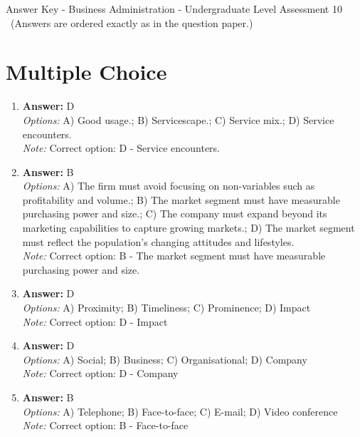 \documentclass[12pt]{article}
\begin{document}
\begin{center}
Answer Key - Business Administration - Undergraduate Level Assessment 10 \
\small (Answers are ordered exactly as in the question paper.)
\end{center}

\section*{Multiple Choice}
\begin{enumerate}[label=\arabic*.]
\item \textbf{Answer:} D
\\ \textit{Options:} A) Good usage.; B) Servicescape.; C) Service mix.; D) Service encounters.
\\ \textit{Note:} Correct option: D - Service encounters.
\item \textbf{Answer:} B
\\ \textit{Options:} A) The firm must avoid focusing on non-variables such as profitability and volume.; B) The market segment must have measurable purchasing power and size.; C) The company must expand beyond its marketing capabilities to capture growing markets.; D) The market segment must reflect the population's changing attitudes and lifestyles.
\\ \textit{Note:} Correct option: B - The market segment must have measurable purchasing power and size.
\item \textbf{Answer:} D
\\ \textit{Options:} A) Proximity; B) Timeliness; C) Prominence; D) Impact
\\ \textit{Note:} Correct option: D - Impact
\item \textbf{Answer:} D
\\ \textit{Options:} A) Social; B) Business; C) Organisational; D) Company
\\ \textit{Note:} Correct option: D - Company
\item \textbf{Answer:} B
\\ \textit{Options:} A) Telephone; B) Face-to-face; C) E-mail; D) Video conference
\\ \textit{Note:} Correct option: B - Face-to-face
\end{enumerate}
\end{document}
